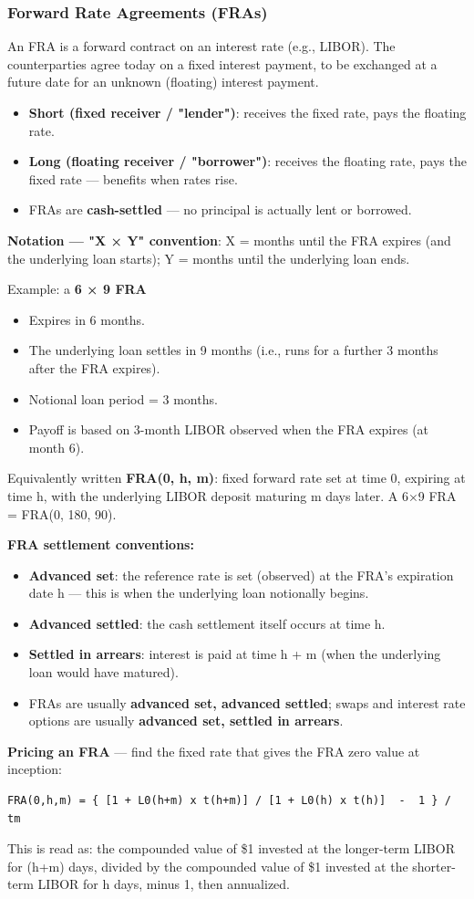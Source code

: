 \documentclass[12pt,openany]{book}
\theoremstyle{definition}
\theoremstyle{remark}
\begin{document}
\subsubsection{Forward Rate Agreements (FRAs)}

An FRA is a forward contract on an interest rate (e.g., LIBOR). The counterparties agree today on a fixed interest payment, to be exchanged at a future date for an unknown (floating) interest payment.

\begin{itemize}
\item \textbf{Short (fixed receiver / "lender")}: receives the fixed rate, pays the floating rate.
\item \textbf{Long (floating receiver / "borrower")}: receives the floating rate, pays the fixed rate — benefits when rates rise.
\item FRAs are \textbf{cash-settled} — no principal is actually lent or borrowed.
\end{itemize}
\textbf{Notation — "X × Y" convention}: X = months until the FRA expires (and the underlying loan starts); Y = months until the underlying loan ends.

Example: a \textbf{6 × 9 FRA}
\begin{itemize}
\item Expires in 6 months.
\item The underlying loan settles in 9 months (i.e., runs for a further 3 months after the FRA expires).
\item Notional loan period = 3 months.
\item Payoff is based on 3-month LIBOR observed when the FRA expires (at month 6).
\end{itemize}
Equivalently written \textbf{FRA(0, h, m)}: fixed forward rate set at time 0, expiring at time h, with the underlying LIBOR deposit maturing m days later. A 6×9 FRA = FRA(0, 180, 90).

\textbf{FRA settlement conventions:}
\begin{itemize}
\item \textbf{Advanced set}: the reference rate is set (observed) at the FRA's expiration date h — this is when the underlying loan notionally begins.
\item \textbf{Advanced settled}: the cash settlement itself occurs at time h.
\item \textbf{Settled in arrears}: interest is paid at time h + m (when the underlying loan would have matured).
\item FRAs are usually \textbf{advanced set, advanced settled}; swaps and interest rate options are usually \textbf{advanced set, settled in arrears}.
\end{itemize}
\textbf{Pricing an FRA} — find the fixed rate that gives the FRA zero value at inception:
\begin{lstlisting}[style=notesCode]
FRA(0,h,m) = { [1 + L0(h+m) x t(h+m)] / [1 + L0(h) x t(h)]  -  1 } / tm
\end{lstlisting}
This is read as: the compounded value of \$1 invested at the longer-term LIBOR for (h+m) days, divided by the compounded value of \$1 invested at the shorter-term LIBOR for h days, minus 1, then annualized.
\end{document}

